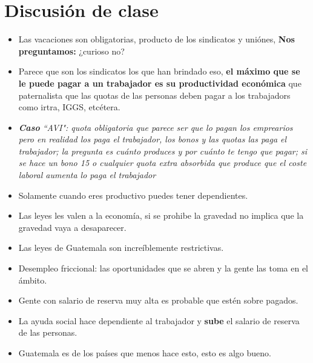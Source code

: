 \section{Discusión de clase}
\begin{itemize}
    \item Las vacaciones son obligatorias, producto de los sindicatos y uniónes, \textbf{Nos preguntamos:} ¿curioso no?
    \item Parece que son los sindicatos los que han brindado eso, \textbf{el máximo que se le puede pagar a un trabajador es su productividad económica} que paternalista que las quotas de las personas deben pagar a los trabajadors como irtra, IGGS, etcétera.
    \item \emph{\textbf{Caso} ``AVI": quota obligatoria que parece ser que lo pagan los emprearios pero en realidad los paga el trabajador, los bonos y las quotas las paga el trabajador; la pregunta es cuánto produces y por cuánto te tengo que pagar; si se hace un bono 15 o cualquier quota extra absorbida que produce que el coste laboral aumenta lo paga el trabajador}
    \item Solamente cuando eres productivo puedes tener dependientes.
    \item Las leyes les valen a la economía, si se prohibe la gravedad no implica que la gravedad vaya a desaparecer. 
    \item Las leyes de Guatemala son increíblemente restrictivas.
    \item Desempleo friccional: las oportunidades que se abren y la gente las toma en el ámbito.
    \item Gente con salario de reserva muy alta es probable que estén sobre pagados.
    \item La ayuda social hace dependiente al trabajador y \textbf{sube} el salario de reserva de las personas.
    \item Guatemala es de los países que menos hace esto, esto es algo bueno. 
\end{itemize}

